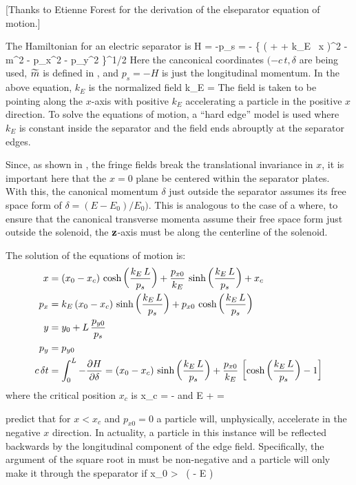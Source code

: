 [Thanks to Etienne Forest for the derivation of the elseparator equation of motion.]

The Hamiltonian for an electric separator is 
\Begineq
  H = -p_s 
  = - \left\{ \left(  + \delta + k_E \, x \right)^2 - 
  \wt m^2 - p_x^2 - p_y^2 \right\}^{1/2}
  \label{hp1b}
\Endeq
Here the canconical coordinates $(-c \, t, \delta$ are being used,
$\widetilde m$ is defined in , and $p_s = -H$ is just the
longitudinal momentum.  In the above equation, $k_E$ is the normalized
field
\Begineq
  k_E = 
\Endeq
The field is taken to be pointing along the $x$-axis with positive
$k_E$ accelerating a particle in the positive $x$ direction. To solve
the equations of motion, a ``hard edge'' model is used where $k_E$ is
constant inside the separator and the field ends abrouptly at the
separator edges.

Since, as shown in , the fringe fields break the
translational invariance in $x$, it is important here that the $x = 0$
plane be centered within the separator plates. With this, the
canonical momentum $\delta$ just outside the separator assumes its
free space form of $\delta = (E - E_0) / E_0)$. This is analogous to
the case of a  where, to ensure that the canonical
transverse momenta assume their free space form just outside the
solenoid, the ${\bf z}$-axis must be along the centerline of the
solenoid.

The solution of the equations of motion is:
\begin{align}
  x   &= (x_0 - x_c) \, \cosh \left( \frac{k_E \, L}{p_s} \right) + 
         \frac{p_{x0}}{k_E} \, \sinh \left( \frac{k_E \, L}{p_s} \right) + x_c \nonumber \\
  p_x &= k_E \, (x_0 - x_c) \, \sinh \left( \frac{k_E \, L}{p_s} \right) + 
         {p_{x0}} \, \cosh \left( \frac{k_E \, L}{p_s} \right) \nonumber \\
  y   &= y_0 + L \, \frac{p_{y0}}{p_s} \label{xxlp} \\
  p_y &= p_{y0} \nonumber \\
  c \, \delta t &=  \int_0^L -\frac{\partial H}{\partial \delta}
      = (x_0 - x_c) \, \sinh \left( \frac{k_E \, L}{p_s} \right) +
        \frac{p_{x0}}{k_E} \, \left[ \cosh \left( \frac{k_E \, L}{p_s} \right) - 1 \right]
        \nonumber
\end{align}
where the critical position $x_c$ is
\Begineq 
  x_c = -
\Endeq
and 
\Begineq
  \wt E \equiv {} + \delta = 
\Endeq
 
 predict that for $x < x_c$ and $p_{x0} = 0$ a particle
will, unphysically, accelerate in the negative $x$ direction. In
actuality, a particle in this instance will be reflected backwards by
the longitudinal component of the edge field. Specifically, the
argument of the square root in  must be non-negative and
a particle will only make it through the speparator if
\Begineq
  x_0 >  \, \left(  - \wt E \right)
\Endeq

